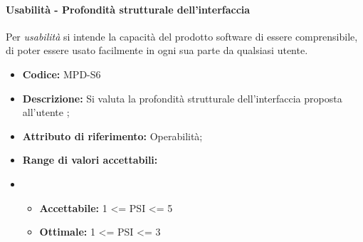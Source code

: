 \paragraph{Usabilità - Profondità strutturale dell'interfaccia}
Per \textit{usabilità} si intende la capacità del prodotto software di essere comprensibile, di poter essere usato facilmente in ogni sua parte da qualsiasi utente.

\begin{itemize}
    \item \textbf{Codice:} MPD-S6
    \item \textbf{Descrizione:} Si valuta la profondità strutturale dell'interfaccia proposta all'utente ;
    \item \textbf{Attributo di riferimento:} Operabilità;
    \item \textbf{Range di valori accettabili:} 
    \item \begin{itemize}
        \item \textbf{Accettabile:} 1 <= PSI <= 5 
        \item \textbf{Ottimale:} 1 <= PSI <= 3
        
    \end{itemize}
\end{itemize}

